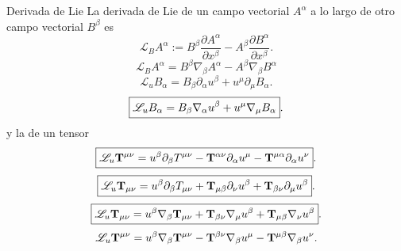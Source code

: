 \begin{definition}{Derivada de Lie}{}
    La derivada de Lie de un campo vectorial $A^\alpha$ a lo largo de otro campo vectorial $B^\beta$ es
    \begin{equation}
        \mathscr{L}_B A^\alpha := B^\beta \frac{\partial A^\alpha}{\partial x^\beta}-A^\beta \frac{\partial B^\alpha}{\partial x^\beta}.
    \end{equation}
    \begin{equation}
        \boxed{\mathscr{L}_B A^\alpha = B^\beta \nabla_\beta A^\alpha  - A^\beta \nabla_\beta B^\alpha }
    \end{equation}
    \begin{equation}
        \boxed{\mathscr{L}_u B_\alpha=B_\beta \partial_\alpha u^\beta+u^\mu \partial_\mu B_\alpha .}
    \end{equation}
    \begin{equation}
        \boxed{\mathscr{L}_u B_\alpha=B_\beta \mathbf{\nabla}_\alpha u^\beta+u^\mu \mathbf{\nabla}_\mu B_\alpha}.
    \end{equation}
    y la de un tensor
    \begin{equation}
        \boxed{\mathscr{L}_u {\mathbf{T}}^{\mu \nu} = u^\beta \partial_\beta T^{\mu \nu}   -  {\mathbf{T}}^{\alpha \nu} \partial_\alpha u^\mu  -{\mathbf{T}}^{\mu \alpha} \partial_\alpha u^\nu}.
    \end{equation}
    \begin{equation}
        \boxed{\mathscr{L}_u {\mathbf{T}}_{\mu \nu} = u^\beta \partial_\beta T_{\mu \nu}   +  {\mathbf{T}}_{\mu \beta } \partial_\nu u^\beta  + {\mathbf{T}}_{ \beta \nu} \partial_\mu u^\beta}.
    \end{equation}
    \begin{equation}
        \boxed{\mathscr{L}_u {\mathbf{T}}_{\mu \nu} = u^\beta \mathbf{\nabla}_\beta {\ensuremath{\mathbf{T}}}_{\mu \nu}+{\mathbf{T}}_{\beta \nu}\mathbf{\nabla}_\mu u^\beta +{\mathbf{T}}_{\mu \beta } \mathbf{\nabla}_\nu u^\beta}.
    \end{equation}
    \begin{equation}
        \mathscr{L}_u {\mathbf{T}}^{\mu \nu} = u^\beta \mathbf{\nabla}_\beta {\ensuremath{\mathbf{T}}}^{\mu \nu}-{\mathbf{T}}^{\beta \nu}\mathbf{\nabla}_\beta u^\mu - {\mathbf{T}}^{\mu \beta } \mathbf{\nabla}_\beta u^\nu.
    \end{equation}
\end{definition}


